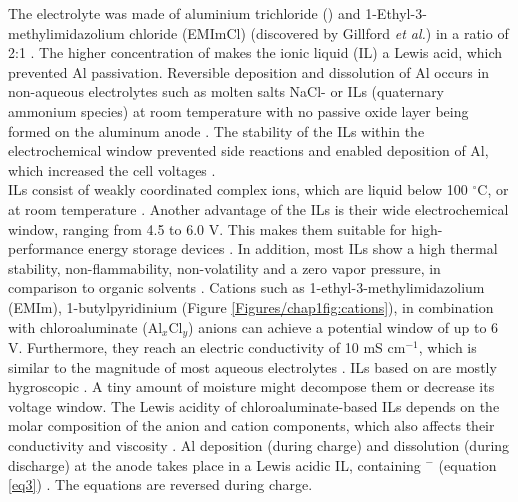 The electrolyte was made of aluminium trichloride () and 1-Ethyl-3-methylimidazolium chloride (EMImCl) (discovered by Gillford \textit{et al.}) in a ratio of 2:1 \cite{gifford_aluminum/chlorine_1988}. The higher concentration of  makes the ionic liquid (IL) a Lewis acid, which prevented Al passivation. 
Reversible deposition and dissolution of Al occurs in non-aqueous electrolytes such as molten salts NaCl- or ILs (quaternary ammonium species) at room temperature with no passive oxide layer being formed on the aluminum anode \cite{vestergaard_molten_1993,galinski_ionic_2006,elia_insights_2017}. The stability of the ILs within the electrochemical window prevented side reactions and enabled deposition of Al, which increased the cell voltages \cite{li_aluminum_2002}.\\ ILs consist of weakly coordinated complex ions, which are liquid below 100 $^{\circ}$C, or at room temperature \cite{hayes_structure_2015}. Another advantage of the ILs is their wide electrochemical window, ranging from 4.5 to 6.0 V. This makes them suitable for high-performance energy storage devices \cite{wang_binder-free_2015}. In addition, most ILs show a high thermal stability, non-flammability, non-volatility and a zero vapor pressure, in comparison to organic solvents \cite{dieter_ionic_1988}. Cations such as 1-ethyl-3-methylimidazolium (EMIm), 1-butylpyridinium (Figure \ref{Figures/chap1fig:cations}), in combination with chloroaluminate (Al$_x$Cl$_y$) anions can achieve a potential window of up to 6 V. Furthermore, they reach an electric conductivity of 10 mS cm$^{-1}$, which is similar to the magnitude of most aqueous electrolytes \cite{ngo_thermal_2000}. ILs based on  are mostly hygroscopic \cite{ueda_electroplating_2012}. A tiny amount of moisture might decompose them or decrease its voltage window. The Lewis acidity of chloroaluminate-based ILs depends on the molar composition of the anion and cation components, which also affects their conductivity and viscosity \cite{buzzeo_non-haloaluminate_2004}. 
Al deposition (during charge) and dissolution (during discharge) at the anode takes place in a Lewis acidic IL, containing $^-$ (equation \ref{eq3}) \cite{galinski_ionic_2006}. The equations are reversed during charge.\\

